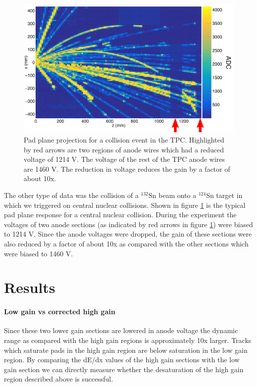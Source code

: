 \documentclass[review]{elsarticle}
\begin{document}
\begin{figure}[H]
\includegraphics[width=\linewidth]{data.pdf}
\caption{Pad plane projection for a collision event in the TPC. Highlighted by red arrows are two regions of anode wires which had a reduced voltage of 1214 V. The voltage of the rest of the TPC anode wires are 1460 V. The reduction in voltage reduces the gain by a factor of about 10x. }
\label{fig:data}
\end{figure}

The other type of data was the collision of a ${}^{132}$Sn beam onto a ${}^{124}$Sn target in which we triggered on central nuclear collisions. Shown in figure \ref{fig:data} is the typical pad plane response for a central nuclear collision. During the experiment the voltages of two anode sections (as indicated by red arrows in figure \ref{fig:data}) were biased to 1214 V. Since the anode voltages were dropped, the gain of these sections were also reduced by a factor of about 10x as compared with the other sections which were biased to 1460 V. 


\section{Results}
\paragraph{Low gain vs corrected high gain}

Since these two lower gain sections are lowered in anode voltage the dynamic range as compared with the high gain regions is approximately 10x larger. Tracks which saturate pads in the high gain region are below saturation in the low gain region. By comparing the dE/dx values of the high gain sections with the low gain section we can directly measure whether the desaturation of the high gain region described above is successful. 
\end{document}
